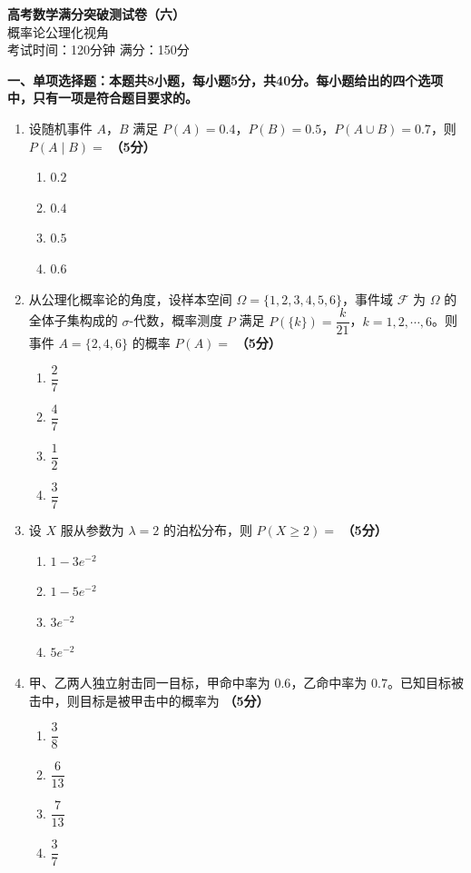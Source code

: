 \documentclass[12pt, a4paper]{ctexart}
\newcommand{\score}[1]{\hfill\textbf{（#1分）}}
\begin{document}
\begin{center}
{\LARGE\bfseries 高考数学满分突破测试卷（六）}\\[8pt]
{\large 概率论公理化视角}\\[6pt]
考试时间：120分钟 \quad 满分：150分
\end{center}

\vspace{10pt}

{\large\bfseries 一、单项选择题：本题共8小题，每小题5分，共40分。每小题给出的四个选项中，只有一项是符合题目要求的。}

\vspace{8pt}

\begin{enumerate}

\item 设随机事件 $A$，$B$ 满足 $P(A)=0.4$，$P(B)=0.5$，$P(A\cup B)=0.7$，则 $P(A\mid B)=$ \score{5}
\begin{enumerate}[label=\Alph*.]
    \item $0.2$
    \item $0.4$
    \item $0.5$
    \item $0.6$
\end{enumerate}

\item 从公理化概率论的角度，设样本空间 $\Omega=\{1,2,3,4,5,6\}$，事件域 $\mathcal{F}$ 为 $\Omega$ 的全体子集构成的 $\sigma$-代数，概率测度 $P$ 满足 $P(\{k\})=\dfrac{k}{21}$，$k=1,2,\cdots,6$。则事件 $A=\{2,4,6\}$ 的概率 $P(A)=$ \score{5}
\begin{enumerate}[label=\Alph*.]
    \item $\dfrac{2}{7}$
    \item $\dfrac{4}{7}$
    \item $\dfrac{1}{2}$
    \item $\dfrac{3}{7}$
\end{enumerate}

\item 设 $X$ 服从参数为 $\lambda=2$ 的泊松分布，则 $P(X\geq 2)=$ \score{5}
\begin{enumerate}[label=\Alph*.]
    \item $1-3e^{-2}$
    \item $1-5e^{-2}$
    \item $3e^{-2}$
    \item $5e^{-2}$
\end{enumerate}

\item 甲、乙两人独立射击同一目标，甲命中率为 $0.6$，乙命中率为 $0.7$。已知目标被击中，则目标是被甲击中的概率为 \score{5}
\begin{enumerate}[label=\Alph*.]
    \item $\dfrac{3}{8}$
    \item $\dfrac{6}{13}$
    \item $\dfrac{7}{13}$
    \item $\dfrac{3}{7}$
\end{enumerate}


\end{enumerate}
\end{document}
